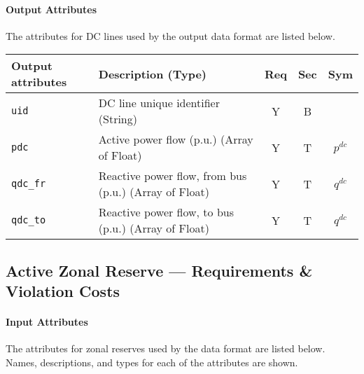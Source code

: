 \documentclass{article}
\begin{document}
\paragraph{Output Attributes}
 The attributes for DC lines
 used by the output data format are listed below.
\begin{center}
\small
\begin{tabular}{ l | l | c | c | c | }
Output attributes & Description (Type) & Req & Sec & Sym\\
\hline
  {\tt uid}    & DC line unique identifier (String)& Y & B & \\
  {\tt pdc} & Active power flow (p.u.) (Array of Float)& Y & T & $p^{dc}$ \\
  {\tt qdc\_fr} & Reactive power flow, from bus (p.u.) (Array of Float)& Y & T & $q^{dc}$ \\
  {\tt qdc\_to} & Reactive power flow, to bus (p.u.) (Array of Float)& Y & T & $q^{dc}$ \\
  \hline
\end{tabular}
\end{center}

\subsection{Active Zonal Reserve ---  Requirements \& Violation Costs}
\label{nom:reserves_active}

\paragraph{Input Attributes}
The attributes for zonal reserves
used by the data format are listed below.
Names, descriptions, and types for each of the attributes are shown.
\end{document}
